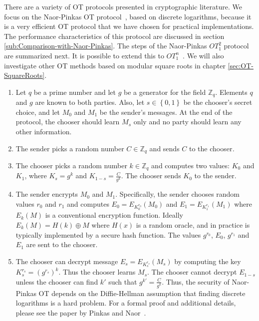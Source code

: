 There are a variety of OT protocols presented in cryptographic literature.
We focus on the Naor-Pinkas OT protocol~\cite{NaorPinkas99}, based
on discrete logarithms, because it is a very efficient OT protocol
that we have chosen for practical implementations. The performance
characteristics of this protocol are discussed in section \ref{sub:Comparison-with-Naor-Pinkas}.
The steps of the Naor-Pinkas $OT_{1}^{2}$ protocol are summarized next.
It is possible to extend this to $OT_{1}^{n}$~\cite{NaorPinkas99}.
We will also investigate other OT methods based on modular square roots in
chapter \ref{sec:OT-SquareRoots}.
\begin{enumerate}
\item Let $q$ be a prime number and let $g$ be a generator for the field
$\mathbb{Z}_{q}$.  Elements $q$ and $g$ are known to both parties. Also,
let $s\in\left\{ 0,1\right\} $ be the chooser's secret choice, and
let $M_{0}$ and $M_{1}$ be the sender's messages. At the end of
the protocol, the chooser should learn $M_{s}$ only and no party
should learn any other information.
\item The sender picks a random number $C\in\mathbb{Z}_{q}$ and sends $C$
to the chooser\emph{.}
\item The chooser picks a random number $k\in\mathbb{Z}_{q}$ and computes
two values: $K_{0}$ and $K_{1}$, where $K_{s}=g^{k}$ and $K_{1-s}=\frac{C}{g^{k}}$.
The chooser sends $K_{0}$ to the sender.
\item The sender encrypts $M_{0}$ and $M_{1}$. Specifically, the sender
chooses random values $r_{0}$ and $r_{1}$ and computes $E_{0}=E_{K_{0}^{r_{0}}}\left(M_{0}\right)$
and $E_{1}=E_{K_{1}^{r_{1}}}\left(M_{1}\right)$ where $E_{k}\left(M\right)$
is a conventional encryption function. Ideally $E_{k}\left(M\right)=H\left(k\right)\oplus M$
where $H\left(x\right)$ is a random oracle, and in practice is typically
implemented by a secure hash function. The values $g^{r_{0}}$, $E_{0}$,
$g^{r_{1}}$ and $E_{1}$ are sent to the chooser.
\item The chooser can decrypt message $E_{s}=E_{K_{s}^{r_{s}}}\left(M_{s}\right)$
by computing the key $K_{s}^{r_{s}}=\left(g^{r_{s}}\right)^{k}$.
Thus the chooser learns $M_{s}$. The chooser cannot decrypt $E_{1-s}$
unless the chooser can find $k'$ such that $g^{k'}=\frac{C}{g^{k}}$.
Thus, the security of Naor-Pinkas OT depends on the Diffie-Hellman
assumption that finding discrete logarithms is a hard problem.
For a formal proof and additional details, please see the paper by 
Pinkas and Naor~\cite{NaorPinkas99}.
\end{enumerate}

